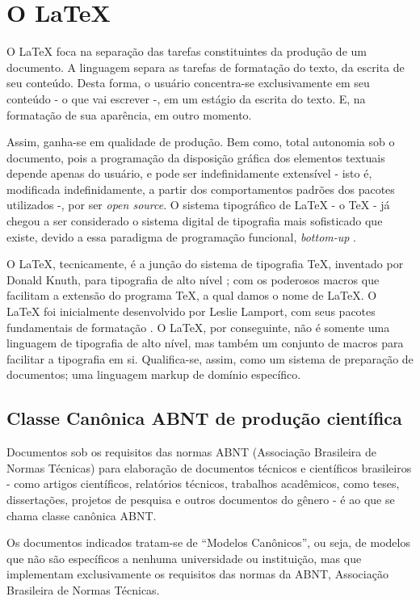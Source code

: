 \documentclass[
12pt,				%
openright,			%
oneside,			%
a4paper,			%
english,			%
french,				%
spanish,			%
brazil,				%
]{abntex2}
\begin{document}
\section{O \LaTeX}

O \LaTeX{} foca na separação das tarefas constituintes da produção de um
documento. A linguagem separa as tarefas de formatação do texto, da
escrita de seu conteúdo. Desta forma, o usuário concentra-se
exclusivamente em seu conteúdo - o que vai escrever -, em um
estágio da escrita do texto. E, na formatação de sua aparência, em
outro momento.

Assim, ganha-se em
qualidade de produção. Bem como, total autonomia sob o documento, pois
a programação da disposição gráfica dos elementos textuais depende apenas do usuário, e
pode ser indefinidamente extensível - isto é, modificada indefinidamente, a partir dos
comportamentos padrões dos pacotes utilizados -, por ser \textit{open source}. O sistema tipográfico de \LaTeX{} - o
\TeX{} - já chegou a ser considerado o sistema digital de
tipografia mais sofisticado que existe, devido a essa paradigma de
programação funcional, \textit{bottom-up} \cite{haralambous2007}.

O \LaTeX, tecnicamente, é a junção do sistema de tipografia \TeX,
inventado por Donald Knuth, para tipografia de alto nível
\cite{knuth1986}; com os poderosos macros que facilitam a extensão do programa \TeX, a qual damos o nome de
\LaTeX. O \LaTeX{} foi inicialmente desenvolvido por Leslie Lamport, com
seus pacotes fundamentais de formatação \cite{lamport1994}. O \LaTeX,
por conseguinte, não é somente uma linguagem de tipografia de alto
nível, mas também um conjunto de macros para facilitar a tipografia em
si. Qualifica-se, assim, como um sistema de preparação de documentos;
uma linguagem markup de domínio específico.

\subsection{Classe Canônica ABNT de produção científica}

Documentos sob os requisitos das normas ABNT (Associação Brasileira de Normas
Técnicas) para elaboração de documentos técnicos e científicos
brasileiros - como artigos científicos, relatórios técnicos, trabalhos
acadêmicos, como teses, dissertações, projetos de pesquisa e outros
documentos do gênero \cite{abntex2012} - é ao que se chama classe
canônica ABNT.

\begin{citacao}
  Os documentos indicados tratam-se de “Modelos Canônicos”, ou seja,
  de modelos que não são específicos a nenhuma universidade ou instituição, mas
  que implementam exclusivamente os requisitos das normas da ABNT, Associação
  Brasileira de Normas Técnicas. \cite[Cap. 1]{araujoclasse}
\end{citacao}
\end{document}
